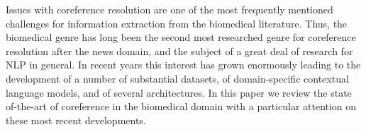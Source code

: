 Issues with coreference resolution are one of the most frequently mentioned  challenges for information extraction from the biomedical literature. Thus, the biomedical genre has long been the second most researched genre for coreference resolution after the news domain, and the subject of a great deal of research for NLP in general. In recent years this interest has grown enormously leading to the development of a number of substantial datasets, of domain-specific contextual language models, and of several architectures.  In this paper we review the state of-the-art of coreference in the biomedical domain with a particular attention on these most recent developments.
